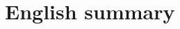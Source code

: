 \renewcommand{\thesection}{\arabic{section}}    %

\renewcommand{\bibname}{References}
\renewcommand\evenpagerightmark{{\scshape\small English summary}}
\renewcommand\oddpageleftmark{{\scshape\small English summary}}

\chapter[English summary]%
{English summary}

\hyphenation{}
\def\hyph{-\penalty0\hskip0pt\relax}



\clearpage{\pagestyle{empty}\cleardoublepage}

\renewcommand*{\thesection}{\thechapter.\arabic{section}}       %


